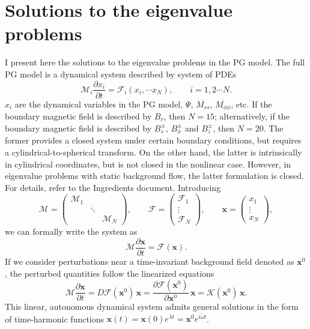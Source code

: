 \chapter{Solutions to the eigenvalue problems}

I present here the solutions to the eigenvalue problems in the PG model.
The full PG model is a dynamical system described by system of PDEs
\[
    \mathcal{M}_i \frac{\partial x_i}{\partial t} = \mathcal{F}_i (x_i, \cdots x_N), \qquad i = 1, 2\cdots N.
\]
$x_i$ are the dynamical variables in the PG model, $\Psi$, $\overline{M_{ss}}$, $\overline{M_{\phi\phi}}$, etc. If the boundary magnetic field is described by $B_r$, then $N=15$; alternatively, if the boundary magnetic field is described by $B_s^{\pm}$, $B_\phi^{\pm}$ and $B_z^{\pm}$, then $N=20$.
The former provides a closed system under certain boundary conditions, but requires a cylindrical-to-spherical transform. On the other hand, the latter is intrinsically in cylindrical coordinates, but is not closed in the nonlinear case. However, in eigenvalue problems with static background flow, the latter formulation is closed. For details, refer to the Ingredients document.
Introducing
\[
    \mathcal{M} = \begin{pmatrix}
        \mathcal{M}_1 & & \\ 
        & \ddots & \\
        & & \mathcal{M}_N
    \end{pmatrix},\qquad 
    \mathcal{F} = \begin{pmatrix} \mathcal{F}_1 \\ \vdots \\ \mathcal{F}_N \end{pmatrix}, \qquad 
    \mathbf{x} = \begin{pmatrix} x_1 \\ \vdots \\ x_N \end{pmatrix},
\]
we can formally write the system as
\[
    \mathcal{M} \frac{\partial \mathbf{x}}{\partial t} = \mathcal{F}(\mathbf{x}).
\]
If we consider perturbations near a time-invariant background field denoted as $\mathbf{x}^0$, the perturbed quantities follow the linearized equations
\[
    \mathcal{M} \frac{\partial \mathbf{x}}{\partial t} = D\mathcal{F}(\mathbf{x}^0) \, \mathbf{x} = \frac{\partial \mathcal{F}(\mathbf{x}^0)}{\partial \mathbf{x}^0} \, \mathbf{x} = \mathcal{K}(\mathbf{x}^0) \, \mathbf{x}.
\]
This linear, autonomous dynamical system admits general solutions in the form of time-harmonic functions $\mathbf{x}(t) = \mathbf{x}(0) e^{\lambda t} = \mathbf{x}^0 e^{i\widetilde{\omega}t}$.
